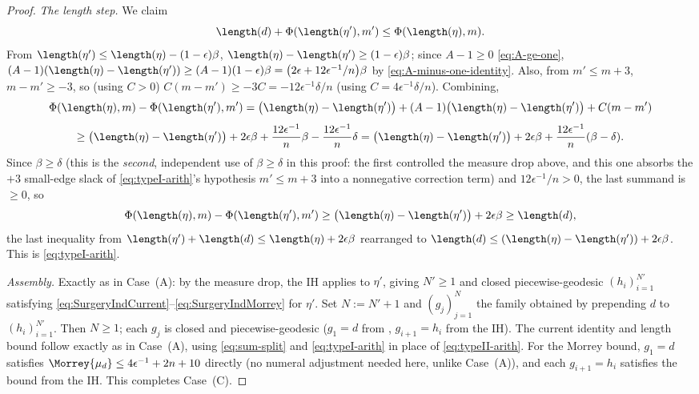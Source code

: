 \begin{proof}
  \emph{The length step.} We claim
  \begin{equation}
    \label{eq:typeI-arith}
    \length(d) + \Phi(\length(\eta'),m') \le \Phi(\length(\eta),m)
    .
  \end{equation}
  From $\length(\eta')\le\length(\eta)-(1-\epsilon)\beta$, $\length(\eta)-\length(\eta') \ge
  (1-\epsilon)\beta$; since $A-1\ge0$ \eqref{eq:A-ge-one}, $(A-1)(\length(\eta)-\length(\eta')) \ge
  (A-1)(1-\epsilon)\beta = \bigl(2\epsilon+12\epsilon^{-1}/n\bigr)\beta$ by
  \eqref{eq:A-minus-one-identity}. Also, from $m'\le m+3$, $m-m'\ge-3$, so (using $C>0$)
  $C(m-m') \ge -3C = -12\epsilon^{-1}\delta/n$ (using $C=4\epsilon^{-1}\delta/n$). Combining,
  \[
    \Phi(\length(\eta),m)-\Phi(\length(\eta'),m') = \bigl(\length(\eta)-\length(\eta')\bigr) +
    (A-1)\bigl(\length(\eta)-\length(\eta')\bigr) + C(m-m')
  \]
  \[
    \ge \bigl(\length(\eta)-\length(\eta')\bigr) + 2\epsilon\beta + \frac{12\epsilon^{-1}}{n}\beta -
    \frac{12\epsilon^{-1}}{n}\delta
    = \bigl(\length(\eta)-\length(\eta')\bigr) + 2\epsilon\beta +
    \frac{12\epsilon^{-1}}{n}(\beta-\delta)
    .
  \]
  Since $\beta\ge\delta$ (this is the \emph{second}, independent use of $\beta\ge\delta$ in this
  proof: the first controlled the measure drop above, and this one absorbs the $+3$ small-edge
  slack of \eqref{eq:typeI-arith}'s hypothesis $m'\le m+3$ into a nonnegative correction term) and
  $12\epsilon^{-1}/n>0$, the last summand is $\ge0$, so
  \[
    \Phi(\length(\eta),m)-\Phi(\length(\eta'),m') \ge \bigl(\length(\eta)-\length(\eta')\bigr) +
    2\epsilon\beta \ge \length(d)
    ,
  \]
  the last inequality from $\length(\eta')+\length(d) \le \length(\eta)+2\epsilon\beta$ rearranged
  to $\length(d) \le (\length(\eta)-\length(\eta'))+2\epsilon\beta$. This is
  \eqref{eq:typeI-arith}.

  \emph{Assembly.} Exactly as in Case~(A): by the measure drop, the IH applies to $\eta'$, giving
  $N'\ge1$ and closed piecewise-geodesic $(h_i)_{i=1}^{N'}$ satisfying
  \eqref{eq:SurgeryIndCurrent}--\eqref{eq:SurgeryIndMorrey} for $\eta'$. Set $N:=N'+1$ and
  $(g_j)_{j=1}^N$ the family obtained by prepending $d$ to $(h_i)_{i=1}^{N'}$. Then $N\ge1$; each
  $g_j$ is closed and piecewise-geodesic ($g_1=d$ from , $g_{i+1}=h_i$ from the
  IH). The current identity and length bound follow exactly as in Case~(A), using
  \eqref{eq:sum-split} and \eqref{eq:typeI-arith} in place of \eqref{eq:typeII-arith}. For the
  Morrey bound, $g_1=d$ satisfies $\Morrey{\mu_d}\le4\epsilon^{-1}+2n+10$ directly (no numeral
  adjustment needed here, unlike Case~(A)), and each $g_{i+1}=h_i$ satisfies the bound from the IH.
  This completes Case~(C).


\end{proof}
